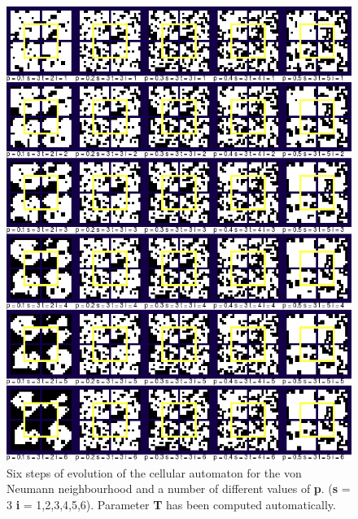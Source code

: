 \documentclass[a4paper, 11pt]{article} %
\begin{document}
\begin{figure}[ht]
	\centering
	\includegraphics[width=1.\textwidth]{neumann_i}
	\caption{Six steps of evolution of the cellular automaton for the von Neumann neighbourhood and a number of different values of \textbf{p}. (\textbf{s} = 3 \textbf{i} = 1,2,3,4,5,6). Parameter \textbf{T} has been computed automatically.}
	\label{fig:results2}
\end{figure}
\end{document}

